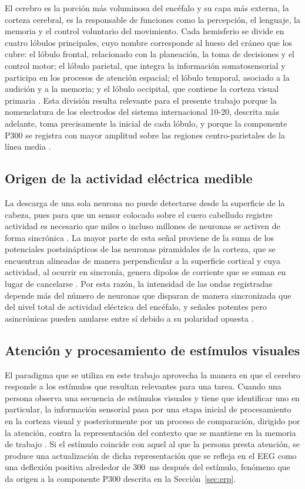El cerebro es la porción más voluminosa del encéfalo y su capa más externa, la corteza cerebral, es
la responsable de funciones como la percepción, el lenguaje, la memoria y el control voluntario del
movimiento. Cada hemisferio se divide en cuatro lóbulos principales, cuyo nombre corresponde al
hueso del cráneo que los cubre: el lóbulo frontal, relacionado con la planeación, la toma de
decisiones y el control motor; el lóbulo parietal, que integra la información somatosensorial y
participa en los procesos de atención espacial; el lóbulo temporal, asociado a la audición y a la
memoria; y el lóbulo occipital, que contiene la corteza visual primaria \cite{snell2014}. Esta
división resulta relevante para el presente trabajo porque la nomenclatura de los electrodos del
sistema internacional 10-20, descrita más adelante, toma precisamente la inicial de cada lóbulo, y
porque la componente P300 se registra con mayor amplitud sobre las regiones centro-parietales de la
línea media \cite{polich2007}.

\subsection{Origen de la actividad eléctrica medible}

La descarga de una sola neurona no puede detectarse desde la superficie de la cabeza, pues para
que un sensor colocado sobre el cuero cabelludo registre actividad es necesario que miles o incluso
millones de neuronas se activen de forma sincrónica \cite{guyton2016}. La mayor parte de esta
señal proviene de la suma de los potenciales postsinápticos de las neuronas piramidales de la
corteza, que se encuentran alineadas de manera perpendicular a la superficie cortical y cuya
actividad, al ocurrir en sincronía, genera dipolos de corriente que se suman en lugar de
cancelarse \cite{niedermeyer2005}. Por esta razón, la intensidad de las ondas registradas depende
más del número de neuronas que disparan de manera sincronizada que del nivel total de actividad
eléctrica del encéfalo, y señales potentes pero asincrónicas pueden anularse entre sí debido a su
polaridad opuesta \cite{guyton2016}.

\subsection{Atención y procesamiento de estímulos visuales}

El paradigma que se utiliza en este trabajo aprovecha la manera en que el cerebro responde a los
estímulos que resultan relevantes para una tarea. Cuando una persona observa una secuencia de
estímulos visuales y tiene que identificar uno en particular, la información sensorial pasa por una
etapa inicial de procesamiento en la corteza visual y posteriormente por un proceso de comparación,
dirigido por la atención, contra la representación del contexto que se mantiene en la memoria de
trabajo \cite{polich2007}. Si el estímulo coincide con aquel al que la persona presta atención, se
produce una actualización de dicha representación que se refleja en el EEG como una deflexión
positiva alrededor de 300~ms después del estímulo, fenómeno que da origen a la componente P300
descrita en la Sección~\ref{sec:erp}.
